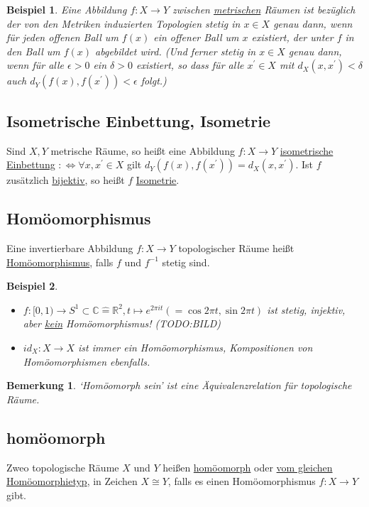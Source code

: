 \documentclass[a4paper,11pt,notitlepage]{report}
\newtheorem{remark}{Bemerkung}[chapter]
\newtheorem{example}{Beispiel}[chapter]
\newcommand{\R}{{\ensuremath{\mathbb{R}}}}
\newcommand{\C}{{\ensuremath{\mathbb{C}}}}
\newenvironment{Kasten}[1]
{
\hspace{0.05\linewidth}
\begin{center}
\begin{minipage}{0.9\linewidth}
\setlength{\fboxsep}{18pt}
\definecolor{shadecolor}{gray}{0.9}
\definecolor{framecolor}{gray}{0}
\def\FrameCommand{\fcolorbox{framecolor}{shadecolor}}
\MakeFramed {\FrameRestore}
\subsection{#1}
\begin{itshape}
}
{
\end{itshape}
\endMakeFramed
\end{minipage}
\end{center}
\vspace{1em}
}
\begin{document}
\begin{example}
	Eine Abbildung $f \colon X \rightarrow Y$ zwischen \underline{metrischen} Räumen ist bezüglich der von den Metriken induzierten Topologien stetig in $x \in X$ genau dann, wenn für jeden offenen Ball um $f(x)$ ein offener Ball um $x$ existiert, der unter $f$ in den Ball um $f(x)$ abgebildet wird. (Und ferner stetig in $x \in X$ genau dann, wenn für alle $\epsilon > 0$ ein $\delta > 0$ existiert, so dass für alle $x^\prime \in X$ mit $d_X(x,x^\prime) < \delta$ auch $d_Y \left( f(x), f(x^\prime) \right) < \epsilon$ folgt.) 
\end{example}

\begin{Kasten}{Isometrische Einbettung, Isometrie}
	Sind $X,Y$ metrische Räume, so heißt eine Abbildung $f \colon X \rightarrow Y$ \underline{isometrische Einbettung}
	\newline	
	 $: \Leftrightarrow \forall x, x^\prime \in X$ gilt $d_Y \left ( f(x), f(x^\prime) \right ) = d_X (x, x^\prime)$.
	\newline
	Ist $f$ zusätzlich \underline{bijektiv}, so heißt $f$ \underline{\underline{Isometrie}}. 
\end{Kasten}

\begin{Kasten}{Homöomorphismus}
	Eine invertierbare Abbildung $f \colon X \rightarrow Y$ topologischer Räume heißt \underline{Homöomorphismus}, falls $f$ und $f^{-1}$ stetig sind.
\end{Kasten}

\begin{example}
	\begin{itemize}
		\item $f \colon [0,1) \rightarrow S^1 \subset \C \hat{=} \R^2, t \mapsto e^{2 \pi i t} (= \cos {2 \pi t}, \sin {2 \pi t})$ ist stetig, injektiv, aber \underline{kein} Homöomorphismus!
		\newline
		(TODO:BILD)
		\item $id_X \colon X \rightarrow X$ ist immer ein Homöomorphismus, Kompositionen von Homöomorphismen ebenfalls.
	\end{itemize}
\end{example}

\begin{remark}
	`Homöomorph sein' ist eine Äquivalenzrelation für topologische Räume.
\end{remark}

\begin{Kasten}{homöomorph}
	Zweo topologische Räume $X$ und $Y$ heißen \underline{homöomorph} oder \underline{vom gleichen Homöomorphietyp}, in Zeichen $X \cong Y$, falls es einen Homöomorphismus $f \colon X \rightarrow Y$ gibt.
\end{Kasten}
\end{document}
